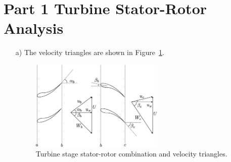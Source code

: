 \documentclass[12pt]{article}
\begin{document}
\begin{titlepage}
\vfill %

\end{titlepage}


\section{Part 1 Turbine Stator-Rotor Analysis}
\begin{itemize}
	\item[a)]
	The velocity triangles are shown in Figure~\ref{fig:stator_rotor}.
	\begin{figure}[H]
		\centering
		\includegraphics[width=0.6\textwidth]{stator_rotor}
		\caption{Turbine stage stator-rotor combination and velocity triangles.}
		\label{fig:stator_rotor}
	\end{figure}
	

\end{itemize}
\end{document}
